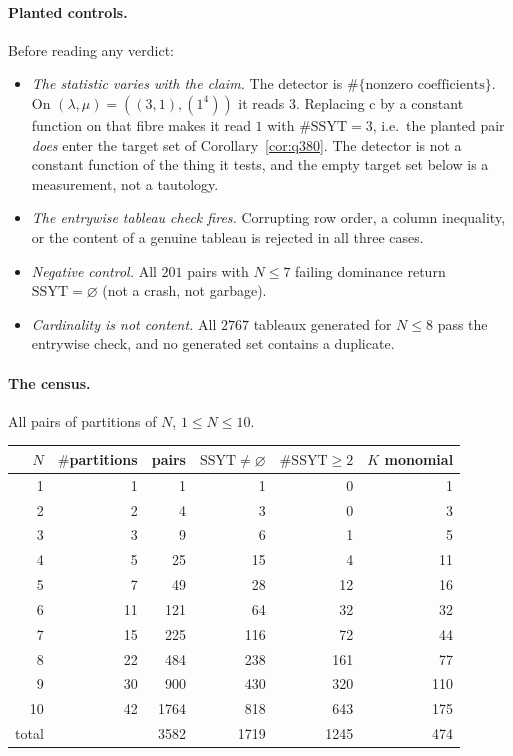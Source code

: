 \documentclass[11pt]{article}
\theoremstyle{plain}
\theoremstyle{definition}
\newcommand{\SSYT}{\mathrm{SSYT}}
\newcommand{\charge}{\mathrm{c}}
\begin{document}
\paragraph{Planted controls.}  Before reading any verdict:
\begin{itemize}
\item \emph{The statistic varies with the claim.}  The detector is
  $\#\{\text{nonzero coefficients}\}$.  On $(\lambda,\mu)=((3,1),(1^4))$ it reads $3$.
  Replacing $\charge$ by a constant function on that fibre makes it read $1$ with
  $\#\SSYT=3$, i.e.\ the planted pair \emph{does} enter the target set of
  Corollary~\ref{cor:q380}.  The detector is not a constant function of the thing it
  tests, and the empty target set below is a measurement, not a tautology.
\item \emph{The entrywise tableau check fires.}  Corrupting row order, a column
  inequality, or the content of a genuine tableau is rejected in all three cases.
\item \emph{Negative control.}  All $201$ pairs with $N\le 7$ failing dominance return
  $\SSYT=\varnothing$ (not a crash, not garbage).
\item \emph{Cardinality is not content.}  All $2767$ tableaux generated for $N\le8$ pass
  the entrywise check, and no generated set contains a duplicate.
\end{itemize}

\paragraph{The census.}  All pairs of partitions of $N$, $1\le N\le 10$.

\begin{center}
\begin{tabular}{rrrrrr}
\hline
$N$ & $\#$partitions & pairs & $\SSYT\neq\varnothing$ & $\#\SSYT\ge2$ & $K$ monomial\\
\hline
 1 &  1 &    1 &   1 &   0 &   1\\
 2 &  2 &    4 &   3 &   0 &   3\\
 3 &  3 &    9 &   6 &   1 &   5\\
 4 &  5 &   25 &  15 &   4 &  11\\
 5 &  7 &   49 &  28 &  12 &  16\\
 6 & 11 &  121 &  64 &  32 &  32\\
 7 & 15 &  225 & 116 &  72 &  44\\
 8 & 22 &  484 & 238 & 161 &  77\\
 9 & 30 &  900 & 430 & 320 & 110\\
10 & 42 & 1764 & 818 & 643 & 175\\
\hline
total & & 3582 & 1719 & 1245 & 474\\
\hline
\end{tabular}
\end{center}
\end{document}
